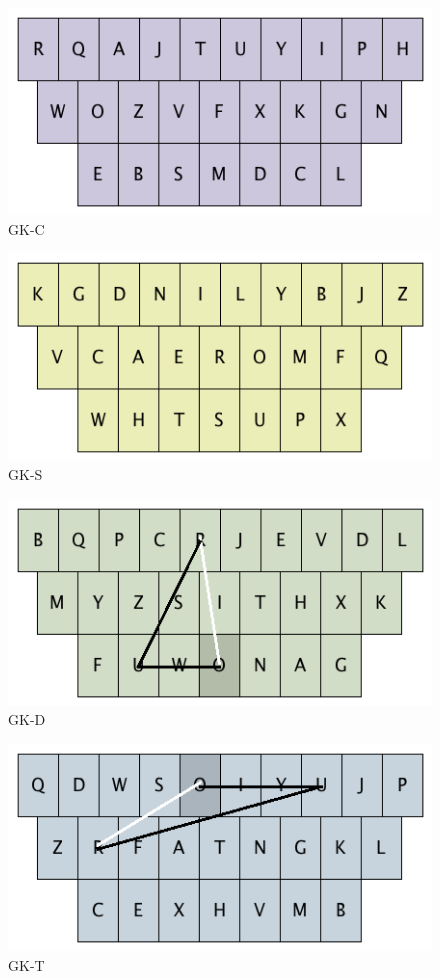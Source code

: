 \documentclass[MTech]{iitmdiss}
\begin{document}
\begin{figure}[h!]
	\centering
	\includegraphics[scale=0.65]{Images/gkc}
	\caption{GK-C}
\end{figure}
\begin{figure}[h!]
	\centering
	\includegraphics[scale=0.65]{Images/gks}
	\caption{GK-S}
\end{figure}
\begin{figure}[h!]
	\centering
	\includegraphics[scale=0.65]{Images/gkd}
	\caption{GK-D}
\end{figure}
\begin{figure}[h!]
	\centering
	\includegraphics[scale=0.65]{Images/gkt}
	\caption{GK-T}
\end{figure}
\end{document}
